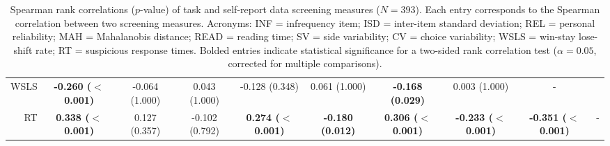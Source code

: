 \documentclass[a4paper,notitlepage,12pt]{article}
\begin{document}
\begin{table}[H]
\begin{adjustbox}{center}
\begin{tabular}{rccccccccc}
        WSLS &  \textbf{-0.260 ($<$0.001)} &              -0.064 (1.000) &               0.043 (1.000) &             -0.128 (0.348) &            0.061 (1.000) &    \textbf{-0.168 (0.029)} &               0.003 (1.000) &                           - &    \\
        RT   &   \textbf{0.338 ($<$0.001)} &               0.127 (0.357) &              -0.102 (0.792) &  \textbf{0.274 ($<$0.001)} &  \textbf{-0.180 (0.012)} &  \textbf{0.306 ($<$0.001)} &  \textbf{-0.233 ($<$0.001)} &  \textbf{-0.351 ($<$0.001)} &  - \\
        \bottomrule
    \end{tabular}
    \end{adjustbox}
    \caption{Spearman rank correlations ($p$-value) of task and self-report data screening measures ($N=393$). Each entry corresponds to the Spearman correlation between two screening measures. Acronyms: INF = infrequency item; ISD = inter-item standard deviation; REL = personal reliability; MAH = Mahalanobis distance; READ = reading time; SV = side variability; CV = choice variability; WSLS = win-stay lose-shift rate; RT = suspicious response times. Bolded entries indicate statistical significance for a two-sided rank correlation test ($\alpha = 0.05$, corrected for multiple comparisons).}
\end{table}
\end{document}
